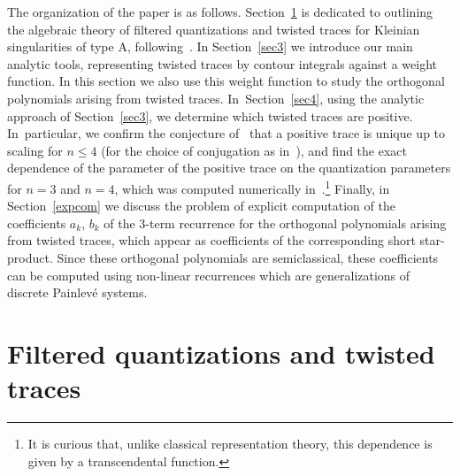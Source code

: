 \documentclass[pdftex]{sigma}
\theoremstyle{definition}
\numberwithin{equation}{section}
\begin{document}
The organization of the paper is as follows. Section~\ref{sec2} is dedicated to outlining the algebraic theory of filtered quantizations and twisted traces for Kleinian singularities of type A, following~\cite{ES}. In Section~\ref{sec3} we introduce our main analytic tools, representing twisted traces by contour integrals against a weight function. In this section we also use this weight function to study the orthogonal polynomials arising from twisted traces. In~Section~\ref{sec4}, using the analytic approach of Section~\ref{sec3}, we determine which twisted traces are positive. In~particular, we confirm the conjecture of~\cite{BPR} that a positive trace is unique up to scaling for $n\le 4$ (for the choice of conjugation as in~\cite{BPR}), and find the exact dependence of the parameter of the positive trace on the quantization parameters for $n=3$ and $n=4$, which was computed numerically in~\cite{BPR}.\footnote{It is curious that, unlike classical representation theory, this dependence is given by a transcendental function.}
Finally, in Section~\ref{expcom} we discuss the problem of explicit computation of the coefficients $a_k$, $b_k$
of the 3-term recurrence for the orthogonal polynomials arising from twisted traces, which
appear as coefficients of the corresponding short star-product. Since these orthogonal polynomials are semiclassical, these coefficients can be computed using non-linear recurrences which are generalizations of discrete Painlev\'e systems.



\section{Filtered quantizations and twisted traces}\label{sec2}
\end{document}
